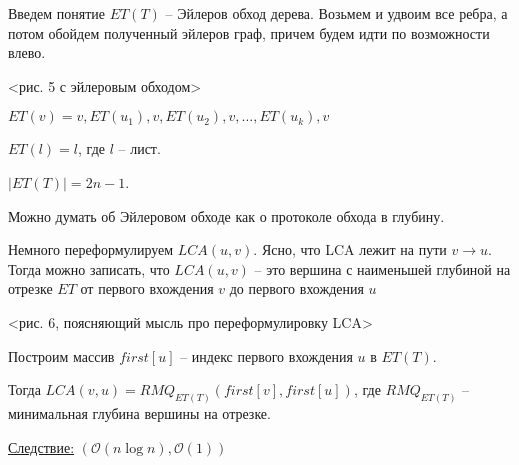 \documentclass[fleqn, 12pt]{article}
\newcommand{\bigo}{\mathcal{O}}
\begin{document}
Введем понятие $ ET(T) $ -- Эйлеров обход дерева. Возьмем и удвоим все ребра, а потом обойдем полученный эйлеров граф, причем будем идти по возможности влево. 

<рис. 5 с эйлеровым обходом>

$ ET(v) = v, ET(u_1), v, ET(u_2), v, \ldots, ET(u_k), v $

$ ET(l) = l $, где $ l $ -- лист.

$ |ET(T)| = 2n - 1  $.

Можно думать об Эйлеровом обходе как о протоколе обхода в глубину. 

Немного переформулируем $ LCA(u,v) $. Ясно, что LCA лежит на пути $ v \to u $. Тогда можно записать, что $ LCA(u, v) $ -- это вершина с наименьшей глубиной на отрезке $ ET $ от первого вхождения $ v $ до первого вхождения $ u $

<рис. 6, поясняющий мысль про переформулировку LCA>

Построим массив $ first[u]  $ -- индекс первого вхождения $ u $ в $ ET(T) $. 

Тогда $ LCA(v, u) = RMQ_{ET(T)} (first[v], first[u]) $, где $ RMQ_{ET(T)} $ -- минимальная глубина вершины на отрезке.

\underline{Следствие:} $ (\bigo(n \log n), \bigo(1)) $
\end{document}
